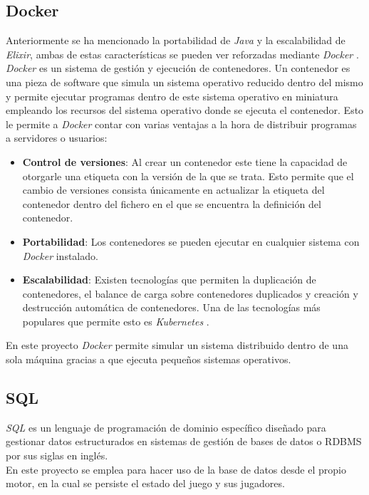 \subsection{Docker}
Anteriormente se ha mencionado la portabilidad de \textit{Java} y la escalabilidad de \textit{Elixir}, ambas de estas características se pueden ver reforzadas mediante \textit{Docker} \cite{docker}. \textit{Docker} es un sistema de gestión y ejecución de contenedores. Un contenedor es una pieza de software que simula un sistema operativo reducido dentro del mismo y permite ejecutar programas dentro de este sistema operativo en miniatura empleando los recursos del sistema operativo donde se ejecuta el contenedor. Esto le permite a \textit{Docker} contar con varias ventajas a la hora de distribuir programas a servidores o usuarios:
\begin{itemize}
	\item \textbf{Control de versiones}: Al crear un contenedor este tiene la capacidad de otorgarle una etiqueta con la versión de la que se trata. Esto permite que el cambio de versiones consista únicamente en actualizar la etiqueta del contenedor dentro del fichero en el que se encuentra la definición del contenedor.
	\item \textbf{Portabilidad}: Los contenedores se pueden ejecutar en cualquier sistema con \textit{Docker} instalado.
	\item \textbf{Escalabilidad}: Existen tecnologías que permiten la duplicación de contenedores, el balance de carga sobre contenedores duplicados y creación y destrucción automática de contenedores. Una de las tecnologías más populares que permite esto es \textit{Kubernetes} \cite{kubernetes}.
\end{itemize}

En este proyecto \textit{Docker} permite simular un sistema distribuido dentro de una sola máquina gracias a que ejecuta pequeños sistemas operativos.

\subsection{SQL}
\textit{SQL} \cite{sql} es un lenguaje de programación de dominio específico diseñado para gestionar datos estructurados en sistemas de gestión de bases de datos o RDBMS por sus siglas en inglés.
\\

En este proyecto se emplea para hacer uso de la base de datos desde el propio motor, en la cual se persiste el estado del juego y sus jugadores.

